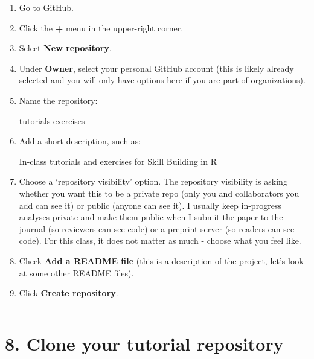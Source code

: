 \documentclass[
  letterpaper,
  DIV=11,
  numbers=noendperiod]{scrartcl}
\newenvironment{Shaded}{\begin{snugshade}}{\end{snugshade}}
\newcommand{\NormalTok}[1]{\textcolor[rgb]{0.00,0.23,0.31}{#1}}
\begin{document}
\begin{enumerate}
\def\labelenumi{\arabic{enumi}.}
\item
  Go to GitHub.
\item
  Click the \textbf{+} menu in the upper-right corner.
\item
  Select \textbf{New repository}.
\item
  Under \textbf{Owner}, select your personal GitHub account (this is
  likely already selected and you will only have options here if you are
  part of organizations).
\item
  Name the repository:

\begin{Shaded}
\begin{Highlighting}[]
\NormalTok{tutorials{-}exercises}
\end{Highlighting}
\end{Shaded}
\item
  Add a short description, such as:

\begin{Shaded}
\begin{Highlighting}[]
\NormalTok{In{-}class tutorials and exercises for Skill Building in R}
\end{Highlighting}
\end{Shaded}
\item
  Choose a `repository visibility' option. The repository visibility is
  asking whether you want this to be a private repo (only you and
  collaborators you add can see it) or public (anyone can see it). I
  usually keep in-progress analyses private and make them public when I
  submit the paper to the journal (so reviewers can see code) or a
  preprint server (so readers can see code). For this class, it does not
  matter as much - choose what you feel like.
\item
  Check \textbf{Add a README file} (this is a description of the
  project, let's look at some other README files).
\item
  Click \textbf{Create repository}.
\end{enumerate}

\begin{center}\rule{0.5\linewidth}{0.5pt}\end{center}

\section{8. Clone your tutorial
repository}\label{clone-your-tutorial-repository}
\end{document}
